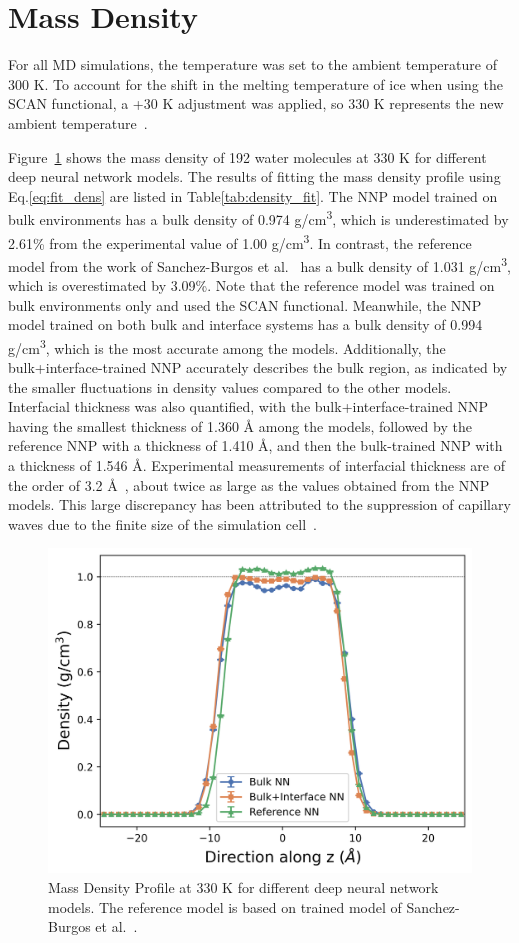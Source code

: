 \section{Mass Density}

For all MD simulations, the temperature was set to the ambient temperature of 300 K. To account for the shift in the melting temperature of ice when using the SCAN functional, a +30 K adjustment was applied, so 330 K represents the new ambient temperature~\cite{piaggi2021phase}.

Figure~\ref{fig:density} shows the mass density of 192 water molecules at 330 K for different deep neural network models. The results of fitting the mass density profile using Eq.\ref{eq:fit_dens} are listed in Table\ref{tab:density_fit}. The NNP model trained on bulk environments has a bulk density of 0.974 \unit{g/cm^3}, which is underestimated by 2.61\% from the experimental value of 1.00 \unit{g/cm^3}. In contrast, the reference model from the work of Sanchez-Burgos et al.~\cite{sanchez2023deep} has a bulk density of 1.031 \unit{g/cm^3}, which is overestimated by 3.09\%. Note that the reference model was trained on bulk environments only and used the SCAN functional. Meanwhile, the NNP model trained on both bulk and interface systems has a bulk density of 0.994 \unit{g/cm^3}, which is the most accurate among the models. Additionally, the bulk+interface-trained NNP accurately describes the bulk region, as indicated by the smaller fluctuations in density values compared to the other models. Interfacial thickness was also quantified, with the bulk+interface-trained NNP having the smallest thickness of 1.360 \unit{\angstrom} among the models, followed by the reference NNP with a thickness of 1.410 \unit{\angstrom}, and then the bulk-trained NNP with a thickness of 1.546 \unit{\angstrom}. Experimental measurements of interfacial thickness are of the order of 3.2 \unit{\angstrom}~\cite{braslau1985surface}, about twice as large as the values obtained from the NNP models. This large discrepancy has been attributed to the suppression of capillary waves due to the finite size of the simulation cell~\cite{matsumoto1988study}.


\begin{figure}[tbhp!]
	\centering
	\includegraphics[width=0.65\linewidth]{images/density_330.png}
	\caption{Mass Density Profile at 330 K for different deep neural
		network
		models. The reference model is based on trained model of
		Sanchez-Burgos et
		al.~\cite{sanchez2023deep}. }\label{fig:density}
\end{figure}



